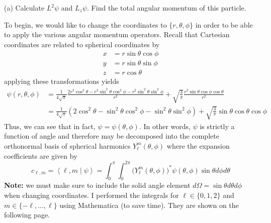 \documentclass[a4paper, 11pt]{article}
\newcommand{\bracket}[2]{\ensuremath{\left\langle #1 \middle| #2 \right\rangle}}
\newenvironment{solution}{%
	\begin{list}{}{%
			\setlength{\topsep}{0pt}%
			\setlength{\leftmargin}{1.5cm}%
			\setlength{\rightmargin}{1.5cm}%
			\setlength{\listparindent}{\parindent}%
			\setlength{\itemindent}{\parindent}%
			\setlength{\parsep}{\parskip}%
		}%
		\item[]}{\end{list}}
\begin{document}
\noindent (a) Calculate $L^2\psi$ and $L_z\psi$. Find the total angular momentum of this particle.\\
\begin{solution}
  \noindent To begin, we would like to change the coordinates to $\{r, \theta, \phi \}$ in order to be able to apply the various angular momentum operators. Recall that Cartesian coordinates are related to spherical coordinates by
  \begin{align*}
    x &= r\sin\theta\cos\phi \\
    y &= r\sin\theta\sin\phi \\
    z &= r\cos\theta
  \end{align*}
  applying these transformations yields
  \begin{align*}
    \psi(r,\theta,\phi) &= \frac{1}{4\sqrt{\pi}}\frac{2r^2\cos^2\theta-r^2\sin^2\theta\cos^2\phi-r^2\sin^2\theta\sin^2\phi}{r^2}+\sqrt{\frac{3}{\pi}}\frac{r^2\sin\theta\cos\phi\cos\theta}{r^2} \\
    &= \frac{1}{4\sqrt{\pi}}\left( 2\cos^2\theta-\sin^2\theta\cos^2\phi-\sin^2\theta\sin^2\phi  \right) + \sqrt{\frac{3}{\pi}}\sin\theta\cos\theta\cos\phi
  \end{align*}
  Thus, we can see that in fact, $\psi=\psi(\theta,\phi)$. In other words, $\psi$ is strictly a function of angle and therefore may be decomposed into the complete orthonormal basis of spherical harmonics $Y_\ell^m(\theta,\phi)$ where the expansion coefficients are given by
  \begin{equation*}
    c_{\ell, m} = \bracket{\ell,m}{\psi}= \int_0^\pi \int_0^{2\pi} \Big(Y_\ell^m(\theta,\phi)\Big)^*\psi(\theta,\phi)\sin\theta d\phi d\theta
  \end{equation*}
  \textbf{Note:} we must make sure to include the solid angle element $d\Omega = \sin\theta d\theta d\phi$ when changing coordinates. I performed the integrals for $\ell\in\{0, 1, 2\}$ and $m\in\{-\ell, ..., \ell\}$ using Mathematica (to save time). They are shown on the following page.

  


\end{solution}
\end{document}
